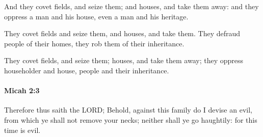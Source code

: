 			\begin{versebox}
					\item[BHS] 
					\item[LXX] 
					\item[ASV] And they covet fields, and seize them; and houses, and take them away: and they oppress a man and his house, even a man and his heritage.
					\item[NIV] They covet fields and seize them, and houses, and take them. They defraud people of their homes, they rob them of their inheritance.
					\item[NRSV] They covet fields, and seize them; houses, and take them away; they oppress householder and house, people and their inheritance.
			\end{versebox}

		\paragraph{Micah 2:3} %
			\label{MICAH-2-3}

			Therefore thus saith the LORD; Behold, against this family do I devise an evil, from which ye shall not remove your necks; neither shall ye go haughtily: for this time is evil.

